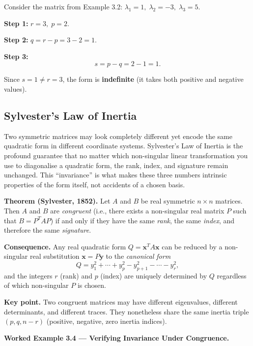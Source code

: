 \documentclass[12pt,a4paper]{article}
\begin{document}
Consider the matrix from Example 3.2:
\(\lambda_1 = 1,\; \lambda_2 = -3,\; \lambda_3 = 5\).

\textbf{Step 1:} \(r = 3,\; p = 2\).

\textbf{Step 2:} \(q = r - p = 3 - 2 = 1\).

\textbf{Step 3:}
\[
  s = p - q = 2 - 1 = 1.
\]

Since \(s = 1 \neq r = 3\), the form is \textbf{indefinite} (it takes both positive and
negative values).

\subsection{Sylvester's Law of Inertia}

Two symmetric matrices may look completely different yet encode the same quadratic form
in different coordinate systems. Sylvester's Law of Inertia is the profound guarantee
that no matter which non-singular linear transformation you use to diagonalise a quadratic
form, the rank, index, and signature remain unchanged. This ``invariance'' is what makes
these three numbers intrinsic properties of the form itself, not accidents of a chosen basis.

\begin{infobox}
\textbf{Theorem (Sylvester, 1852).} Let \(A\) and \(B\) be real symmetric \(n \times n\)
matrices. Then \(A\) and \(B\) are \emph{congruent} (i.e., there exists a non-singular
real matrix \(P\) such that \(B = P^{T} A P\)) if and only if they have the same
\emph{rank}, the same \emph{index}, and therefore the same \emph{signature}.

\medskip
\textbf{Consequence.} Any real quadratic form \(Q = \mathbf{x}^{T} A \mathbf{x}\) can be
reduced by a non-singular real substitution \(\mathbf{x} = P\mathbf{y}\) to the
\emph{canonical form}
\[
  Q = y_1^2 + \cdots + y_p^2 - y_{p+1}^2 - \cdots - y_r^2,
\]
and the integers \(r\) (rank) and \(p\) (index) are uniquely determined by \(Q\)
regardless of which non-singular \(P\) is chosen.

\medskip
\textbf{Key point.} Two congruent matrices may have different eigenvalues, different
determinants, and different traces. They nonetheless share the same inertia triple
\((p, q, n - r)\) (positive, negative, zero inertia indices).
\end{infobox}

\medskip
\noindent\textbf{Worked Example 3.4 --- Verifying Invariance Under Congruence.}
\end{document}
